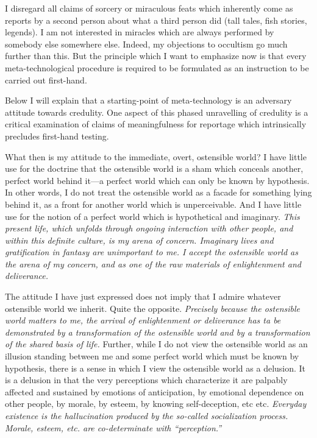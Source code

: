 I disregard all claims of sorcery or miraculous feats which inherently come as 
reports by a second person about what a third person did (tall tales, fish stories, 
legends). I am not interested in miracles which are always performed by somebody 
else somewhere else. Indeed, my objections to occultism go much further than this. 
But the principle which I want to emphasize now is that every meta-technological 
procedure is required to be formulated as an instruction to be carried out first-hand. 

Below I will explain that a starting-point of meta-technology is an 
adversary attitude towards credulity. One aspect of this phased unravelling of credulity 
is a critical examination of claims of meaningfulness for reportage which intrinsically 
precludes first-hand testing. 

\visbreak

What then is my attitude to the immediate, overt, ostensible world? I have little 
use for the doctrine that the ostensible world is a sham which conceals another, 
perfect world behind it---a perfect world which can only be known by hypothesis. 
In other words, I do not treat the ostensible world as a facade for something lying 
behind it, as a front for another world which is unperceivable. And I have little use 
for the notion of a perfect world which is hypothetical and imaginary. \textit{This present 
life, which unfolds through ongoing interaction with other people, and within this definite 
culture, is my arena of concern. Imaginary lives and gratification in fantasy are unimportant 
to me. I accept the ostensible world as the arena of my concern, and as one of the 
raw materials of enlightenment and deliverance.}

The attitude I have just expressed does not imply that I admire whatever 
ostensible world we inherit. Quite the opposite. \textit{Precisely because the ostensible world 
matters to me, the arrival of enlightenment or deliverance has ta be demonstrated by a 
transformation of the ostensible world and by a transformation of the shared basis of life.}
Further, while I do not view the ostensible world as an illusion standing between 
me and some perfect world which must be known by hypothesis, there is a sense in 
which I view the ostensible world as a delusion. It is a delusion in that the very 
perceptions which characterize it are palpably affected and sustained by emotions 
of anticipation, by emotional dependence on other people, by morale, by esteem, 
by knowing self-deception, etc etc. \textit{Everyday existence is the hallucination produced 
by the so-called socialization process. Morale, esteem, etc. are co-determinate with 
\enquote{perception.}}

